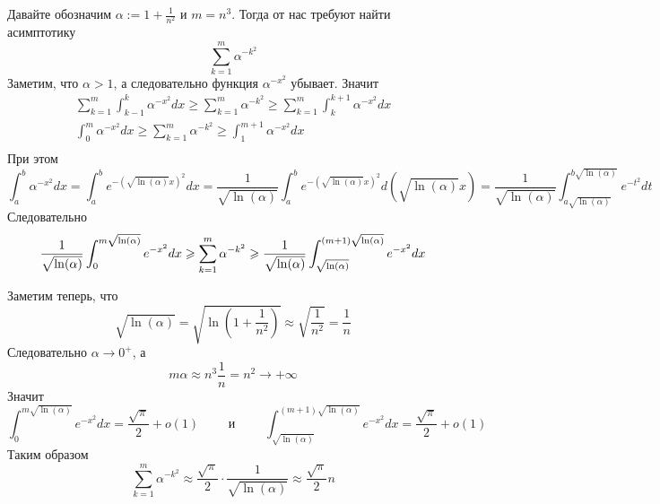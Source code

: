 \documentclass[12pt,a4paper]{article}
\begin{document}
    \begin{enumproblem}
        Давайте обозначим $\alpha := 1 + \frac{1}{n^2}$ и $m = n^3$. Тогда от нас требуют найти асимптотику
        \[\sum_{k=1}^m \alpha^{-k^2}\]
        Заметим, что $\alpha > 1$, а следовательно функция $\alpha^{-x^2}$ убывает. Значит
        \begin{gather*}
            \sum_{k=1}^m \int_{k-1}^k \alpha^{-x^2} dx
            \geqslant \sum_{k=1}^m \alpha^{-k^2} \geqslant
            \sum_{k=1}^m \int_k^{k+1} \alpha^{-x^2} dx\\
            \int_0^m \alpha^{-x^2} dx
            \geqslant \sum_{k=1}^m \alpha^{-k^2} \geqslant
            \int_1^{m+1} \alpha^{-x^2} dx\\
        \end{gather*}
        При этом
        \[
            \int_a^b \alpha^{-x^2} dx
            = \int_a^b e^{-\left(\sqrt{\ln(\alpha)}x\right)^2} dx
            = \frac{1}{\sqrt{\ln(\alpha)}} \int_a^b e^{-\left(\sqrt{\ln(\alpha)}x\right)^2} d\left(\sqrt{\ln(\alpha)}x\right)
            = \frac{1}{\sqrt{\ln(\alpha)}} \int_{a\sqrt{\ln(\alpha)}}^{b\sqrt{\ln(\alpha)}} e^{-t^2} dt
        \]
        Следовательно
        \[
            \frac{1}{\sqrt{\ln(\alpha)}} \int_0^{m\sqrt{\ln(\alpha)}} e^{-x^2} dx
            \geqslant \sum_{k=1}^m \alpha^{-k^2} \geqslant
            \frac{1}{\sqrt{\ln(\alpha)}} \int_{\sqrt{\ln(\alpha)}}^{(m+1)\sqrt{\ln(\alpha)}} e^{-x^2} dx\\  
        \]

        Заметим теперь, что
        \[
            \sqrt{\ln(\alpha)}
            = \sqrt{\ln\left(1 + \frac{1}{n^2}\right)}
            \approx \sqrt{\frac{1}{n^2}}
            = \frac{1}{n}
        \]
        Следовательно $\alpha \to 0^+$, а
        \[
            m \alpha \approx n^3 \frac{1}{n} = n^2 \to +\infty
        \]
        Значит
        \[
            \int_0^{m\sqrt{\ln(\alpha)}} e^{-x^2} dx = \frac{\sqrt{\pi}}{2} + o(1)
            \qquad \text{ и } \qquad
            \int_{\sqrt{\ln(\alpha)}}^{(m+1)\sqrt{\ln(\alpha)}} e^{-x^2} dx = \frac{\sqrt{\pi}}{2} + o(1)
        \]
        Таким образом
        \[
            \sum_{k=1}^m \alpha^{-k^2}
            \approx \frac{\sqrt{\pi}}{2} \cdot \frac{1}{\sqrt{\ln(\alpha)}}
            \approx \frac{\sqrt{\pi}}{2} n
        \]
    \end{enumproblem}
\end{document}
